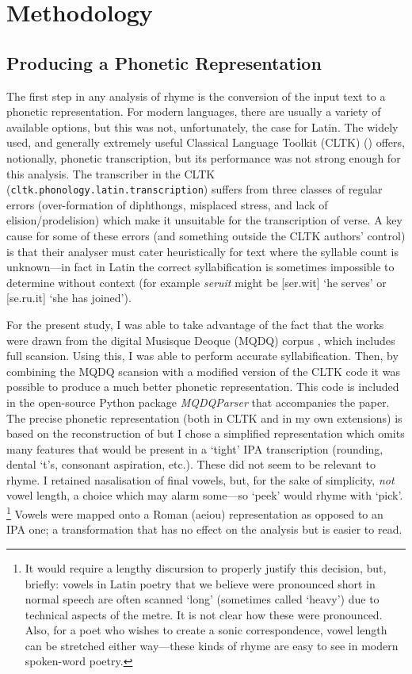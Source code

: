 \documentclass[twocolumn, switch, a4paper]{article} %
\begin{document}
\section{Methodology}
\label{sec:methods}

\subsection{Producing a Phonetic Representation}

The first step in any analysis of rhyme is the conversion of the input text to
a phonetic representation. For modern languages, there are usually a variety
of available options, but this was not, unfortunately, the case for Latin. The
widely used, and generally extremely useful Classical Language Toolkit (CLTK)
() offers, notionally, phonetic transcription, but its
performance was not strong enough for this analysis. The transcriber in the
CLTK (\texttt{cltk.phonology.latin.transcription}) suffers from three classes
of regular errors (over-formation of diphthongs, misplaced stress, and lack of
elision/prodelision) which make it unsuitable for the transcription of verse.
A key cause for some of these errors (and something outside the CLTK authors'
control) is that their analyser must cater heuristically for text where the
syllable count is unknown---in fact in Latin the correct syllabification is
sometimes impossible to determine without context (for example \emph{seruit}
might be [ser.wit] `he serves' or [se.ru.it] `she has joined').

For the present study, I was able to take advantage of the fact that the works
were drawn from the digital Musisque Deoque (MQDQ) corpus \cite{mqdq_2007},
which includes full scansion. Using this, I was able to perform accurate
syllabification. Then, by combining the MQDQ scansion with a modified version
of the CLTK code it was possible to produce a much better phonetic
representation. This code is included in the open-source Python package
\emph{MQDQParser} \cite{nagy_mqdq_2019} that accompanies the paper. The
precise phonetic representation (both in CLTK and in my own extensions) is
based on the reconstruction of  but I chose a simplified
representation which omits many features that would be present in a `tight'
IPA transcription (rounding, dental `t's, consonant aspiration, etc.). These
did not seem to be relevant to rhyme. I retained nasalisation of final vowels,
but, for the sake of simplicity, \emph{not} vowel length, a choice which may
alarm some---so `peek' would rhyme with `pick'. \footnote{
  It would require a lengthy discursion to properly justify this decision, but,
  briefly: vowels in Latin poetry that we believe were pronounced short in
  normal speech are often scanned `long' (sometimes called `heavy') due to
  technical aspects of the metre. It is not clear how these were pronounced.
  Also, for a poet who wishes to create a sonic correspondence, vowel length can
  be stretched either way---these kinds of rhyme are easy to see in modern
  spoken-word poetry.
}
Vowels were mapped onto a Roman (aeiou) representation as opposed to an IPA
one; a transformation that has no effect on the analysis but is easier to
read.
\end{document}
